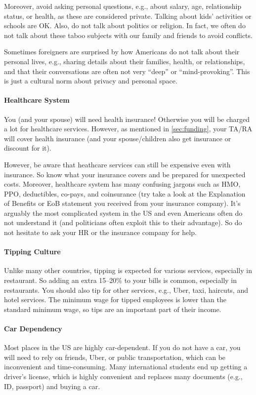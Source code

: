 \documentclass[oneside,11pt,dvipsnames]{book}
\begin{document}
Moreover, avoid asking personal questions, e.g., about salary, age, relationship status, or health, as these are considered private.  Talking about kids' activities or schools are OK. Also, do not talk about politics or religion.  In fact, we often do not talk about these taboo subjects with our family and friends to avoid conflicts.  

Sometimes foreigners are surprised by how Americans do not talk about their personal lives, e.g., sharing details about their families, health, or relationships, and that their conversations are often not very ``deep'' or ``mind-provoking''. This is just a cultural norm about privacy and personal space.

  \paragraph{Healthcare System}  You (and your spouse) will need health insurance! Otherwise you will be charged a lot for healthcare services. However, as mentioned in \autoref{sec:funding}, your  TA/RA  will cover health insurance (and your spouse/children also get insurance or discount for it). 
  
  However, be aware that heathcare services can still be expensive even with insurance. So  know what your insurance covers and be prepared for unexpected costs.  Moreover, healthcare system has many confusing jargons such as HMO, PPO, deductibles, co-pays, and coinsurance (try take a look at the Explanation of Benefits or EoB statement you received from your insurance company). It's arguably the most complicated system in the US and even Americans often do not understand it (and politicians often exploit this to their advantage).  So do not hesitate to ask your HR or the insurance company for help.
  
  
  \paragraph{Tipping Culture} Unlike many other countries, tipping is expected for various services, especially in restaurant. So adding an extra 15--20\% to your bills is common, especially in restaurants.
  You should also tip for other services, e.g., Uber, taxi, haircuts, and hotel services.  The minimum wage for tipped employees is lower than the standard minimum wage, so tips are an important part of their income.

  \paragraph{Car Dependency} Most places in the US are highly car-dependent. If you do not have a car, you will need to rely on friends, Uber, or public transportation, which can be inconvenient and time-consuming. Many international students end up getting a driver's license, which is highly convenient and replaces many documents (e.g., ID, passport) and buying a car.
\end{document}
